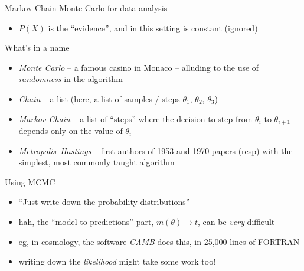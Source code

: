 \documentclass[compress,t]{beamer}
\begin{document}
\begin{frame}{Markov Chain Monte Carlo for data analysis}
{\begin{itemize}
    \item $P(X)$ is the ``evidence'', and in this setting is constant (ignored)
    \end{itemize}
  }%
\end{frame}

\begin{frame}{What's in a name}
  \begin{itemize}
  \item \emph{Monte Carlo} -- a famous casino in Monaco -- alluding to the use of \emph{randomness} in the algorithm
  \item \emph{Chain} -- a list (here, a list of samples / steps $\theta_1$, $\theta_2$, $\theta_3$)
  \item \emph{Markov Chain} -- a list of ``steps'' where the decision to step from $\theta_{i}$ to $\theta_{i+1}$
    depends only on the value of $\theta_i$
  \end{itemize}

  \begin{itemize}
  \item \emph{Metropolis--Hastings} -- first authors of 1953 and 1970 papers (resp) with the simplest, most commonly taught algorithm
  \end{itemize}
\end{frame}

\begin{frame}{Using MCMC}
  \begin{itemize}
  \item ``Just write down the probability distributions''
  \item hah, the ``model to predictions'' part, $m(\theta) \to t$, can be \emph{very} difficult
  \item eg, in cosmology, the software \emph{CAMB} does this, in 25,000 lines of FORTRAN
  \item writing down the \emph{likelihood} might take some work too!
  \end{itemize}
\end{frame}
\end{document}
